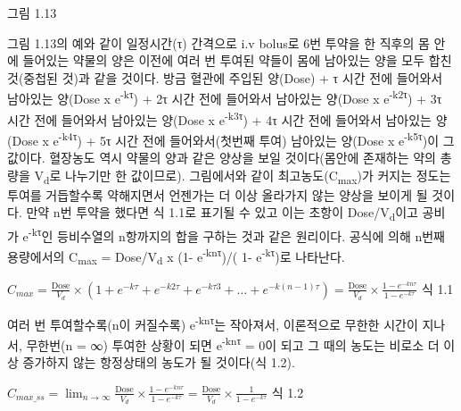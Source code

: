 \documentclass[
  11pt,
  krantz2, a4paper, twoside]{krantz}
\begin{document}
그림 1.13

그림 1.13의 예와 같이 일정시간(τ) 간격으로 i.v bolus로 6번 투약을 한
직후의 몸 안에 들어있는 약물의 양은 이전에 여러 번 투여된 약들이 몸에
남아있는 양을 모두 합친 것(중첩된 것)과 같을 것이다. 방금 혈관에 주입된
양(Dose) + τ 시간 전에 들어와서 남아있는 양(Dose x e\textsuperscript{-kτ}) + 2τ 시간
전에 들어와서 남아있는 양(Dose x e\textsuperscript{-k2τ}) + 3τ 시간 전에 들어와서
남아있는 양(Dose x e\textsuperscript{-k3τ}) + 4τ 시간 전에 들어와서 남아있는 양(Dose x
e\textsuperscript{-k4τ}) + 5τ 시간 전에 들어와서(첫번째 투여) 남아있는 양(Dose x
e\textsuperscript{-k5τ})이 그 값이다. 혈장농도 역시 약물의 양과 같은 양상을 보일
것이다(몸안에 존재하는 약의 총량을 V\textsubscript{d}로 나누기만 한 값이므로).
그림에서와 같이 최고농도(C\textsubscript{max})가 커지는 정도는 투여를 거듭할수록
약해지면서 언젠가는 더 이상 올라가지 않는 양상을 보이게 될 것이다. 만약
n번 투약을 했다면 식 1.1로 표기될 수 있고 이는 초항이 Dose/V\textsubscript{d}이고
공비가 e\textsuperscript{-kτ}인 등비수열의 n항까지의 합을 구하는 것과 같은 원리이다.
공식에 의해 n번째 용량에서의 C\textsubscript{max} = Dose/V\textsubscript{d} x (1- e\textsuperscript{-knτ})/( 1-
e\textsuperscript{-kτ})로 나타난다.

\(C_{max} = \frac{\text{Dose}}{V_{d}} \times \left( 1 + e^{- k\tau} + e^{- k2\tau} + e^{- k\tau 3} + \ldots + e^{- k\left( n - 1 \right)\tau} \right) = \frac{\text{Dose}}{V_{d}} \times \frac{1 - e^{- kn\tau}}{1 - e^{- k\tau}}\)
식 1.1

여러 번 투여할수록(n이 커질수록) e\textsuperscript{-knτ}는 작아져서, 이론적으로 무한한
시간이 지나서, 무한번(n = ∞) 투여한 상황이 되면 e\textsuperscript{-knτ} = 0이 되고 그
때의 농도는 비로소 더 이상 증가하지 않는 항정상태의 농도가 될 것이다(식
1.2).

\({C_{max\_ ss} = \lim_{n \rightarrow \infty}}{\frac{\text{Dose}}{V_{d}} \times \frac{1 - e^{- kn\tau}}{1 - e^{- k\tau}} = \frac{\text{Dose}}{V_{d}} \times \frac{1}{1 - e^{- k\tau}}}\)
식 1.2
\end{document}
